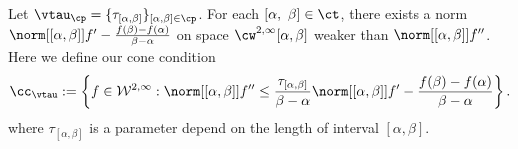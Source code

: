 \documentclass[]{elsarticle}
\theoremstyle{definition}
\theoremstyle{remark}
\newcommand{\FYnorm}[1]{\abs{#1}_{\cf_\cy}}
\newcommand{\GYnorm}[1]{\abs{#1}_{\cg_\cy}}
\begin{document}
Let $\vtau_{\cp}=\{\tau_{[\alpha,\beta]}\}_{[\alpha,\beta] \in \cp}$.
For each $[\alpha, \ \beta] \in \ct$, there exists a norm $\norm[{[\alpha, \beta]}]{f'-\frac{f(\beta)-f(\alpha)}{\beta-\alpha}}$ on space
$\cw^{2,\infty}[\alpha,\beta]$ weaker than $\norm[{[\alpha, \beta]}]{f''}$.
Here we define our cone condition
%
%
%
%
%
\begin{equation} \label{coneappxdef}
\cc_{\vtau}:=\left\{f \in  \mathcal{W}^{2,\infty} : \norm[{[\alpha, \beta]}]{f''}\leq \frac{\tau_{[\alpha,\beta]}}{\beta-\alpha} \norm[{[\alpha, \beta]}]{f'-\frac{f(\beta)-f(\alpha)}{\beta-\alpha}}\right\}.
\end{equation}
where $\tau_{[\alpha,\beta]}$ is a parameter depend on the length of interval $[\alpha,\beta]$.\\
\end{document}
